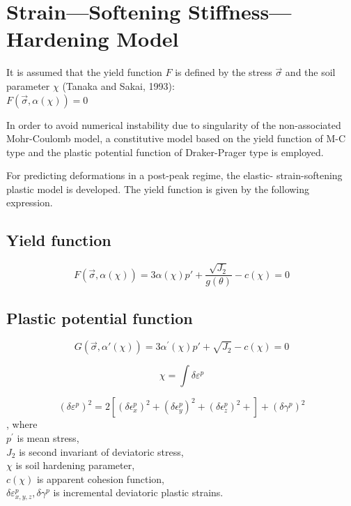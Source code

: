\documentclass[a4paper, nobind]{templates/ociamthesis}
\begin{document}
\hypertarget{strainsoftening-stiffnesshardening-model}{%
\section{Strain---Softening Stiffness---Hardening Model}\label{strainsoftening-stiffnesshardening-model}}

It is assumed that the yield function \(F\) is defined by the stress \(\vec{\sigma}\) and the soil parameter \(\chi\) (Tanaka and Sakai, 1993):\\
\(F(\vec{\sigma},\alpha(\chi))=0\)

In order to avoid numerical instability due to singularity of the non-associated Mohr-Coulomb model, a constitutive model based on the yield function of M-C type and the plastic potential function of Draker-Prager type is employed.

For predicting deformations in a post-peak regime, the elastic- strain-softening plastic model is developed. The yield function is given by the following expression.

\hypertarget{yield-function}{%
\subsection{Yield function}\label{yield-function}}

\[
  F(\vec{\sigma},\alpha(\chi)) = 3\alpha(\chi)p'+\frac{\sqrt{J_2}}{g(\theta)}-c(\chi) = 0
\]

\hypertarget{plastic-potential-function}{%
\subsection{Plastic potential function}\label{plastic-potential-function}}

\[
  G(\vec{\sigma},\alpha'(\chi)) = 3\alpha^{'}(\chi)p'+\sqrt{J_2}-c(\chi) = 0
\]

\[
  \chi = \int \delta\varepsilon^{p}
\]

\[
  (\delta\varepsilon^{p})^2 = 2[(\delta\epsilon_x^{p})^2+(\delta\epsilon_y^{p})^2+(\delta\epsilon_z^{p})^2+]+(\delta\gamma^{p})^2
\]
, where\\
\(p^{'}\) is mean stress,\\
\(J_2\) is second invariant of deviatoric stress,\\
\(\chi\) is soil hardening parameter,\\
\(c(\chi)\) is apparent cohesion function,\\
\(\delta \varepsilon_{x,y,z}^{p} , \delta \gamma^{p}\) is incremental deviatoric plastic strains.
\end{document}
